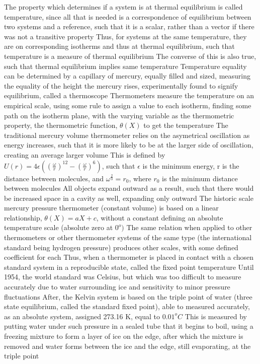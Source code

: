 \begin{outline*}
\3 The property which determines if a system is at thermal equilibrium is called temperature, since all that is needed is a correspondence of equilibrium between two systems and a reference, such that it is a scalar, rather than a vector if there was not a transitive property
\2 Thus, for systems at the same temperature, they are on corresponding isotherms and thus at thermal equilibrium, such that temperature is a measure of thermal equilibrium
\3 The converse of this is also true, such that thermal equilibrium implies same temperature
\1 Temperature equality can be determined by a capillary of mercury, equally filled and sized, measuring the equality of the height the mercury rises, experimentally found to signify equilibrium, called a thermoscope
\2 Thermometers measure the temperature on an empirical scale, using some rule to assign a value to each isotherm, finding some path on the isotherm plane, with the varying variable as the thermometric property, the thermometric function, $\theta(X)$ to get the temperature
\3 The traditional mercury volume thermometer relies on the asymetrical oscillation as energy increases, such that it is more likely to be at the larger side of oscillation, creating an average larger volume
\4 This is defined by $U(r) = 4\epsilon((\frac{\omega}{r})^{12} - (\frac{\omega}{r})^6)$, such that $\epsilon$ is the minimum energy, r is the distance between molecules, and $\omega^{\frac{2}{3}} = r_0$, where $r_0$ is the minimum distance between molecules
\4 All objects expand outward as a result, such that there would be increased space in a cavity as well, expanding only outward
\2 The historic scale mercury pressure thermometer (constant volume) is based on a linear relationship, $\theta(X) = aX + c$, without a constant defining an absolute temperature scale (absolute zero at $0^o)$
\3 The same relation when applied to other thermometers or other thermometer systems of the same type (the international standard being hydrogen pressure) produces other scales, with some defined coefficient for each
\2 Thus, when a thermometer is placed in contact with a chosen standard system in a reproducible state, called the fixed point temperature
\3 Until 1954, the world standard was Celsius, but which was too difficult to measure accurately due to water surrounding ice and sensitivity to minor pressure fluctuations
\3 After, the Kelvin system is based on the triple point of water (three state equilibrium, called the standard fixed point), able to measured accurately, as an absolute system, assigned 273.16 K, equal to $0.01^o C$
\4 This is measured by putting water under such pressure in a sealed tube that it begins to boil, using a freezing mixture to form a layer of ice on the edge, after which the mixture is removed and water forms between the ice and the edge, still evaporating, at the triple point
\end{outline*}
